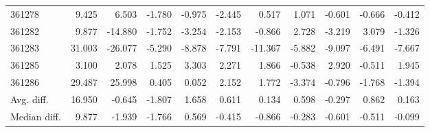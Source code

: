 \begin{tabular}{lrrrrrrrrrr}
361278 & 9.425 & 6.503 & -1.780 & -0.975 & -2.445 & 0.517 & 1.071 & -0.601 & -0.666 & -0.412 \\
361282 & 9.877 & -14.880 & -1.752 & -3.254 & -2.153 & -0.866 & 2.728 & -3.219 & 3.079 & -1.326 \\
361283 & 31.003 & -26.077 & -5.290 & -8.878 & -7.791 & -11.367 & -5.882 & -9.097 & -6.491 & -7.667 \\
361285 & 3.100 & 2.078 & 1.525 & 3.303 & 2.271 & 1.866 & -0.538 & 2.920 & -0.511 & 1.945 \\
361286 & 29.487 & 25.998 & 0.405 & 0.052 & 2.152 & 1.772 & -3.374 & -0.796 & -1.768 & -1.394 \\
Avg. diff. & 16.950 & -0.645 & -1.807 & 1.658 & 0.611 & 0.134 & 0.598 & -0.297 & 0.862 & 0.163 \\
Median diff. & 9.877 & -1.939 & -1.766 & 0.569 & -0.415 & -0.866 & -0.283 & -0.601 & -0.511 & -0.099 \\
\bottomrule
\end{tabular}
